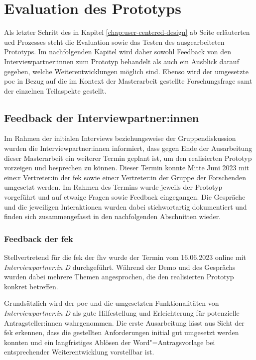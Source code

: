 \documentclass[a4paper,12pt,twoside]{scrreprt}
\begin{document}
\cleardoublepage
\chapter{Evaluation des Prototyps}
\label{chap:evaluation-prototyp}

Als letzter Schritt des in Kapitel \ref{chap:user-centered-design} ab Seite \pageref{chap:user-centered-design} erläuterten \acl{ucd} Prozesses steht die Evaluation sowie das Testen des ausgearbeiteten Prototyps. Im nachfolgenden Kapitel wird daher sowohl Feedback von den Interviewpartner:innen zum Prototyp behandelt als auch ein Ausblick darauf gegeben, welche Weiterentwicklungen möglich sind. Ebenso wird der umgesetzte \acl{poc} in Bezug auf die im Kontext der Masterarbeit gestellte Forschungsfrage samt der einzelnen Teilaspekte gestellt.

\section{Feedback der Interviewpartner:innen}
\label{sec:feedback-interviewpartner}

Im Rahmen der initialen Interviews beziehungsweise der Gruppendiskussion wurden die Interviewpartner:innen informiert, dass gegen Ende der Ausarbeitung dieser Masterarbeit ein weiterer Termin geplant ist, um den realisierten Prototyp vorzeigen und besprechen zu können. Dieser Termin konnte Mitte Juni 2023 mit eine:r Vertreter:in der \acl{fek} sowie eine:r Vertreter:in der Gruppe der Forschenden umgesetzt werden. Im Rahmen des Termins wurde jeweils der Prototyp vorgeführt und auf etwaige Fragen sowie Feedback eingegangen. Die Gespräche und die jeweiligen Interaktionen wurden dabei stichwortartig dokumentiert und finden sich zusammengefasst in den nachfolgenden Abschnitten wieder.

\subsection{Feedback der \acl{fek}}
\label{sub-sec:feedback-fek}

Stellvertretend für die \ac{fek} der \ac{fhv} wurde der Termin vom 16.06.2023 online mit \textit{Interviewpartner:in D} durchgeführt. Während der Demo und des Gesprächs wurden dabei mehrere Themen angesprochen, die den realisierten Prototyp konkret betreffen.

Grundsätzlich wird der \ac{poc} und die umgesetzten Funktionalitäten von \textit{Interviewpartner:in D} als gute Hilfestellung und Erleichterung für potenzielle Antragsteller:innen wahrgenommen. Die erste Ausarbeitung lässt aus Sicht der \acl{fek} erkennen, dass die gestellten Anforderungen initial gut umgesetzt werden konnten und ein langfristiges Ablösen der Word"=Antragsvorlage bei entsprechender Weiterentwicklung vorstellbar ist.
\end{document}
